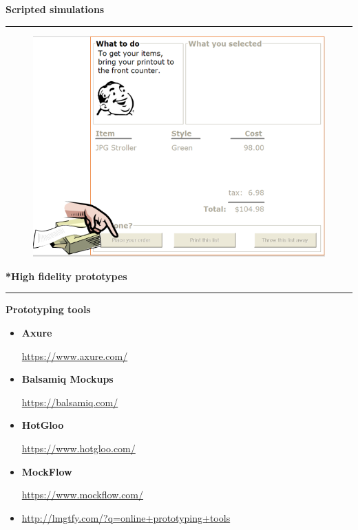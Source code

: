 \documentclass[pdf]{beamer}
\begin{document}
\begin{frame} 
\vspace{8mm}
\textcolor{myBlue}{\textbf{\Large{Scripted simulations}}}

\textcolor{red}{\rule{10cm}{1mm}}

    \begin{figure}[b]
    	\includegraphics[scale = 0.55]{35_1.png}
    \end{figure}
\end{frame}



\begin{frame}
\vspace{8mm}
\textcolor{myBlue}{\textbf{\Large{*High fidelity prototypes}}}

\textcolor{red}{\rule{10cm}{1mm}}

\textbf{Prototyping tools}
\begin{itemize}
\item \textbf{Axure}

\url{https://www.axure.com/}

\item \textbf{Balsamiq Mockups}

\url{https://balsamiq.com/}

\item \textbf{HotGloo}

\url{https://www.hotgloo.com/}

\item \textbf{MockFlow}

\url{https://www.mockflow.com/}
\newline

\item \url{http://lmgtfy.com/?q=online+prototyping+tools}
\end{itemize}

\end{frame}
\end{document}

